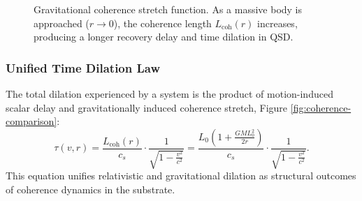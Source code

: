 \documentclass[entropy,article,submit,pdftex,moreauthors]{Definitions/mdpi}
\begin{document}
\begin{figure}[ht]
\centering
{}
\caption{Gravitational coherence stretch function. As a massive body is approached ($r \to 0$), the coherence length $L_{\text{coh}}(r)$ increases, producing a longer recovery delay and time dilation in QSD.}
\label{fig:Lcoh-stretch}
\end{figure}


\subsubsection{Unified Time Dilation Law}

The total dilation experienced by a system is the product of motion-induced scalar delay and gravitationally induced coherence stretch, Figure \ref{fig:coherence-comparison}:
\begin{equation}
\tau(v, r) = \frac{L_{\text{coh}}(r)}{c_s} \cdot \frac{1}{\sqrt{1 - \frac{v^2}{c^2}}}
= \frac{L_0 \left(1 + \frac{GM L_0^2}{2r}\right)}{c_s} \cdot \frac{1}{\sqrt{1 - \frac{v^2}{c^2}}}.
\end{equation}
This equation unifies relativistic and gravitational dilation as structural outcomes of coherence dynamics in the substrate.
\end{document}
